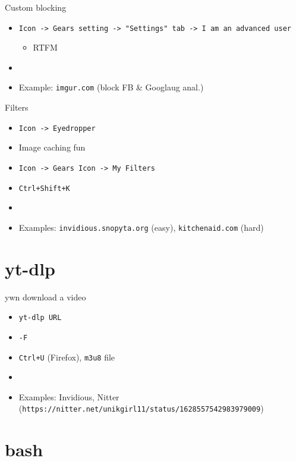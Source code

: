 \documentclass{beamer}
\begin{document}
\begin{frame}{Custom blocking}
\begin{itemize}
	\item \texttt{Icon -> Gears setting -> "Settings" tab -> I am an advanced user}
	\begin{itemize}
		\item RTFM
	\end{itemize}
	\item[]
	\item \small Example: \texttt{imgur.com} (block FB \& Googlaug anal.)
\end{itemize}
\end{frame}

\begin{frame}{Filters}
\begin{itemize}
	\item \texttt{Icon -> Eyedropper}
	\item Image caching fun
	\item \texttt{Icon -> Gears Icon -> My Filters}
	\item \texttt{Ctrl+Shift+K}
	\item[]
	\item \small Examples: \texttt{invidious.snopyta.org} (easy), \texttt{kitchenaid.com} (hard)
\end{itemize}
\end{frame}

\section{yt-dlp}

\begin{frame}{ywn download a video}
\begin{itemize}
	\item \texttt{yt-dlp URL}
	\item \texttt{-F}
	\item \texttt{Ctrl+U} (Firefox), \texttt{m3u8} file
	\item[]
	\item \small Examples: Invidious, Nitter \scriptsize(\texttt{https://nitter.net/unikgirl11/status/1628557542983979009})
\end{itemize}
\end{frame}

\section{bash}
\end{document}
